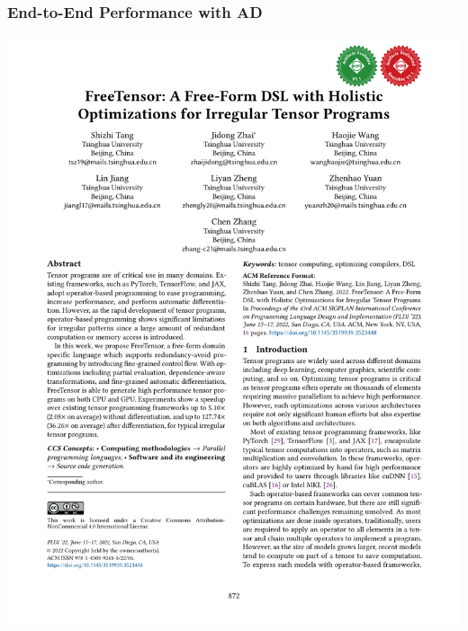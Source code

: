 \documentclass[12pt,aspectratio=169]{beamer}
\begin{document}
    \begin{frame}
        \frametitle{End-to-End Performance with AD}

        \includegraphics[page=12,trim=2.2cm 12.8cm 2.2cm 9.2cm,clip,scale=0.8]{paper.pdf}
    \end{frame}
\end{document}

